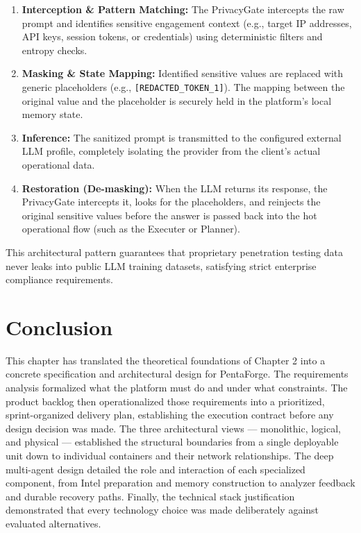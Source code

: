\documentclass[12pt,a4paper]{report}
\begin{document}
\begin{enumerate}
    \item \textbf{Interception \& Pattern Matching:} The PrivacyGate intercepts the
    raw prompt and identifies sensitive engagement context (e.g., target IP addresses,
    API keys, session tokens, or credentials) using deterministic filters and entropy
    checks.
    \item \textbf{Masking \& State Mapping:} Identified sensitive values are replaced
    with generic placeholders (e.g., \texttt{[REDACTED\_TOKEN\_1]}). The mapping
    between the original value and the placeholder is securely held in the platform's
    local memory state.
    \item \textbf{Inference:} The sanitized prompt is transmitted to the configured
    external LLM profile, completely isolating the provider from the client's actual
    operational data.
    \item \textbf{Restoration (De-masking):} When the LLM returns its response, the
    PrivacyGate intercepts it, looks for the placeholders, and reinjects the original
    sensitive values before the answer is passed back into the hot operational flow
    (such as the Executer or Planner).
\end{enumerate}

This architectural pattern guarantees that proprietary penetration testing data
never leaks into public LLM training datasets, satisfying strict enterprise
compliance requirements.

\section{Conclusion}

This chapter has translated the theoretical foundations of Chapter 2 into a
concrete specification and architectural design for PentaForge. The requirements
analysis formalized what the platform must do and under what constraints. The
product backlog then operationalized those requirements into a prioritized,
sprint-organized delivery plan, establishing the execution contract before any
design decision was made. The three architectural views --- monolithic, logical,
and physical --- established the structural boundaries from a single deployable
unit down to individual containers and their network relationships. The deep
multi-agent design detailed the role and interaction of each specialized
component, from Intel preparation and memory construction to analyzer feedback
and durable recovery paths. Finally, the technical stack justification
demonstrated that every technology choice was made deliberately against evaluated
alternatives.
\end{document}
